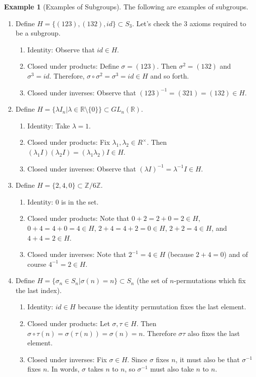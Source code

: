 \documentclass[12pt]{article}
\theoremstyle{definition}
\newtheorem{example}{\color{WildStrawberry}Example}
\theoremstyle{definition}
\begin{document}
\begin{example}[Examples of Subgroups] The following are examples of subgroups.
\begin{enumerate}
	\item Define $H = \{ (1 2 3), (1 3 2), id \} \subset S_3$. Let's check the 3 axioms required to be a subgroup.
	\begin{enumerate}
		\item Identity: Observe that $id \in H$.
		\item Closed under products: Define $\sigma = (1 2 3)$. Then $\sigma^2 = (1 3 2)$ and $\sigma^3 = id$. Therefore, $\sigma \circ \sigma^2 = \sigma^3 = id \in H$ and so forth. 
		\item Closed under inverses: Observe that $(1 2 3)^{-1} = (3 2 1) = (1 3 2) \in H$. 
	\end{enumerate}
	\item Define $H = \{ \lambda I_n \vert \lambda \in \mathbb{R} \setminus \{0\} \} \subset GL_n(\mathbb{R})$.
	\begin{enumerate}
		\item Identity: Take $\lambda = 1$.
		\item Closed under products: Fix $\lambda_1, \lambda_2 \in R^{\times}$. Then $(\lambda_1 I)(\lambda_2 I) = (\lambda_1 \lambda_2) I \in H$.
		\item Closed under inverses: Observe that $(\lambda I)^{-1} = \lambda^{-1} I \in H$.
	\end{enumerate}
	\item Define $H = \{2, 4, 0 \} \subset \mathbb{Z} / 6 \mathbb{Z}$.
	\begin{enumerate}
		\item Identity: $0$ is in the set.
		\item Closed under products: Note that $0 + 2 = 2 + 0 = 2 \in H$, $0 + 4 = 4 + 0 = 4 \in H$, $2 + 4 = 4 + 2 = 0 \in H$, $2 + 2 = 4 \in H$, and $4 + 4 = 2 \in H$.
		\item Closed under inverses: Note that $2^{-1} = 4 \in H$ (because $2 + 4 = 0$) and of course $4^{-1} = 2 \in H$.
	\end{enumerate}
	\item Define $H = \{ \sigma_n \in S_n | \sigma(n) = n \} \subset S_n$ (the set of $n$-permutations which fix the last index).
	\begin{enumerate}
		\item Identity: $id \in H$ because the identity permutation fixes the last element.
		\item Closed under products: Let $\sigma, \tau \in H$. Then $\sigma \circ \tau (n) = \sigma(\tau(n)) = \sigma(n) = n$. Therefore $\sigma \tau$ also fixes the last element.
		\item Closed under inverses: Fix $\sigma \in H$. Since $\sigma$ fixes $n$, it must also be that $\sigma^{-1}$ fixes $n$. In words, $\sigma$ takes $n$ to $n$, so $\sigma^{-1}$ must also take $n$ to $n$.
	\end{enumerate}
\end{enumerate}
\end{example}
\end{document}
